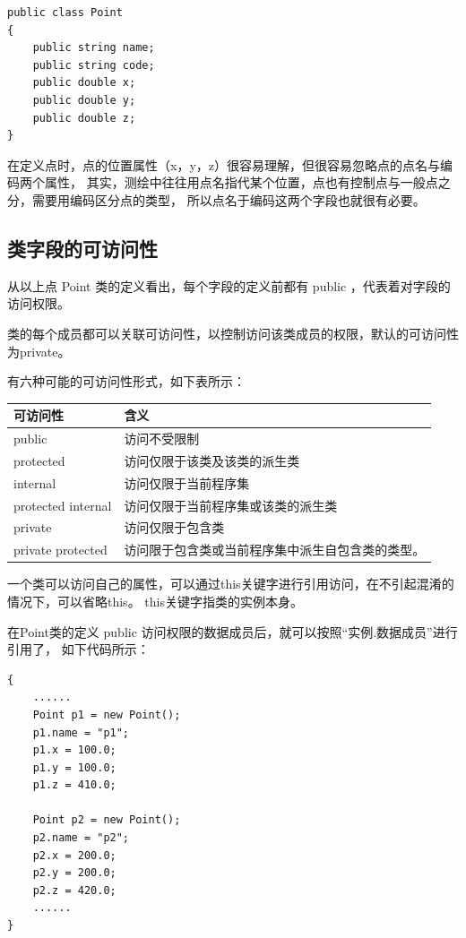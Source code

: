 \begin{lstlisting}
public class Point
{
    public string name;
    public string code;
    public double x;
    public double y;
    public double z;
}
\end{lstlisting}

在定义点时，点的位置属性（x，y，z）很容易理解，但很容易忽略点的点名与编码两个属性，
其实，测绘中往往用点名指代某个位置，点也有控制点与一般点之分，需要用编码区分点的类型，
所以点名于编码这两个字段也就很有必要。

\subsection{类字段的可访问性}

从以上点 Point 类的定义看出，每个字段的定义前都有 public ，代表着对字段的访问权限。

类的每个成员都可以关联可访问性，以控制访问该类成员的权限，默认的可访问性为private。

有六种可能的可访问性形式，如下表所示：

\begin{tabular}{|l|l|}
\hline
可访问性                 &   含义  \\
\hline
public                  &  访问不受限制   \\
protected               &  访问仅限于该类及该类的派生类  \\
internal                &  访问仅限于当前程序集  \\
protected internal      &  访问仅限于当前程序集或该类的派生类  \\
private                 &  访问仅限于包含类  \\
private protected       &  访问限于包含类或当前程序集中派生自包含类的类型。 \\
\hline
\end{tabular}

一个类可以访问自己的属性，可以通过this关键字进行引用访问，在不引起混淆的情况下，可以省略this。
this关键字指类的实例本身。

在Point类的定义 public 访问权限的数据成员后，就可以按照``实例.数据成员''进行引用了，
如下代码所示：

\begin{lstlisting}
{
    ......
    Point p1 = new Point();
    p1.name = "p1";
    p1.x = 100.0;
    p1.y = 100.0;
    p1.z = 410.0;

    Point p2 = new Point();
    p2.name = "p2";
    p2.x = 200.0;
    p2.y = 200.0;
    p2.z = 420.0;
    ......
}
\end{lstlisting}

